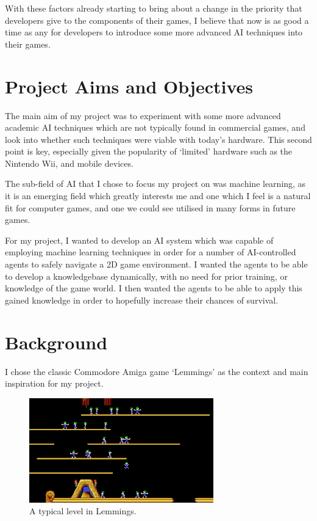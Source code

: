 \documentclass[a4paper,oneside]{report}
\begin{document}
With these factors already starting to bring about a change in the priority that developers give to the components of their games, I believe that now is as good a time as any for developers to introduce some more advanced AI techniques into their games.

\section{Project Aims and Objectives}

The main aim of my project was to experiment with some more advanced academic AI techniques which are not typically found in commercial games, and look into whether such techniques were viable with today's hardware. This second point is key, especially given the popularity of `limited' hardware such as the Nintendo Wii, and mobile devices.

The sub-field of AI that I chose to focus my project on was machine learning, as it is an emerging field which greatly interests me and one which I feel is a natural fit for computer games, and one we could see utilised in many forms in future games.

For my project, I wanted to develop an AI system which was capable of employing machine learning techniques in order for a number of AI-controlled agents to safely navigate a 2D game environment. I wanted the agents to be able to develop a knowledgebase dynamically, with no need for prior training, or knowledge of the game world. I then wanted the agents to be able to apply this gained knowledge in order to hopefully increase their chances of survival. 

\section{Background}

I chose the classic Commodore Amiga game `Lemmings' as the context and main inspiration for my project.

\begin{figure}
  \centering
    \includegraphics[width=80mm]{sources/images/lemmings3}
    \caption{A typical level in Lemmings.\label{screen}}
\end{figure}
\end{document}
